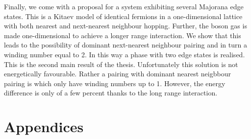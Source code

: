 \documentclass[9pt, twoside]{Thesis}
\begin{document}
Finally, we come with a proposal for a system exhibiting several Majorana edge states. This is a Kitaev model of identical fermions in a one-dimensional lattice with both nearest and next-nearest neighbour hopping. Further, the boson gas is made one-dimensional to achieve a longer range interaction. We show that this leads to the possibility of dominant next-nearest neighbour pairing and in turn a winding number equal to 2. In this way a phase with two edge states is realised. This is the second main result of the thesis. Unfortunately this solution is not energetically favourable. Rather a pairing with dominant nearest neigbbour pairing is which only have winding numbers up to 1. However, the energy difference is only of a few percent thanks to the long range interaction. 

\newpage 


\part{Appendices}

\appendix %













\backmatter


\label{Bibliography}

\chead{}
\printbibliography
\end{document}

